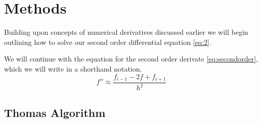 \section*{Methods}
Building upon concepts of numerical derivatives discussed earlier
we will begin outlining how to solve our second order differential
equation \cref{eq:2}. \par We will continue with the equation for the
second order derivate \cref{eq:secondorder}, which we will write in a shorthand
notation. \begin{equation}
  f'' \approx \frac{f_{i-1} - 2f + f_{i+1}}{h^2}
\end{equation}

\subsection*{Thomas Algorithm}
